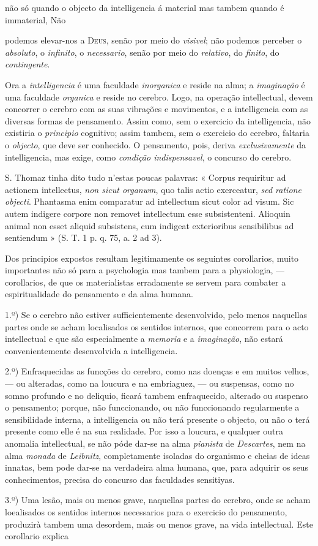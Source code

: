 não só quando o objecto da intelligencia á material mas tambem quando é immaterial, Não\par *podemos elevar-nos a \textsc{Deus}, senão por meio do \emph{visivel}; não podemos perceber o \emph{absoluto}, o \emph{infinito}, o \emph{necessario}, senão por meio do \emph{relativo}, do \emph{finito}, do \emph{contingente}.\par Ora a \emph{intelligencia} é uma faculdade \emph{inorganica} e reside na alma; a \emph{imaginação} é uma faculdade \emph{organica} e reside no cerebro. Logo, na operação intellectual, devem concorrer o cerebro com as suas vibrações e movimentos, e a intelligencia com as diversas formas de pensamento. Assim como, sem o exercicio da intelligencia, não existiria o \emph{principio} cognitivo; assim tambem, sem o exercicio do cerebro, faltaria o \emph{objecto}, que deve ser conhecido. O pensamento, pois, deriva \emph{exclusivamente} da intelligencia, mas exige, como \emph{condição indispensavel}, o concurso do cerebro.\par S. Thomaz tinha dito tudo n'estas poucas palavras: « Corpus requiritur ad actionem intellectus, \emph{non sicut organwm}, quo talis actio exerceatur, \emph{sed ratione objecti}. Phantasma enim comparatur ad intellectum sicut color ad visum. Sic autem indigere corpore non removet intellectum esse subsistenteni. Alioquin animal non esset aliquid subsistens, cum indigeat exterioribus sensibilibus ad sentiendum » (S. T. 1 p. q. 75, a. 2 ad 3).\par Dos principios expostos resultam legitimamente os seguintes corollarios, muito importantes não só para a psychologia mas tambem para a physiologia, --- corollarios, de que os materialistas erradamente se servem para combater a espiritualidade do pensamento e da alma humana.\par 1.º) Se o cerebro não estiver sufficientemente desenvolvido, pelo menos naquellas partes onde se acham localisados os sentidos internos, que concorrem para o acto intellectual e que são especialmente a \emph{memoria} e a \emph{imaginação}, não estará convenientemente desenvolvida a intelligencia.\par 2.º) Enfraquecidas as funcções do cerebro, como nas doenças e em muitos velhos, --- ou alteradas, como na loucura e na embriaguez, --- ou suspensas, como no somno profundo e no deliquio, ficará tambem enfraquecido, alterado ou suspenso o pensamento; porque, não funccionando, ou não funccionando regularmente a sensibilidade interna, a intelligencia ou não terá presente o objecto, ou não o terá presente como elle é na sua realidade. Por isso a loucura, e qualquer outra anomalia intellectual, se não póde dar-se na alma \emph{pianista} de \emph{Descartes}, nem na alma \emph{monada} de \emph{Leibnitz}, completamente isoladas do organismo e cheias de ideas innatas, bem pode dar-se na verdadeira alma humana, que, para adquirir os seus conhecimentos, precisa do concurso das faculdades sensitiyas.\par 3.º) Uma lesão, mais ou menos grave, naquellas partes do cerebro, onde se acham loealisados os sentidos internos necessarios para o exercicio do pensamento, produzirà tambem uma desordem, mais ou menos grave, na vida intellectual. Este corollario explica 